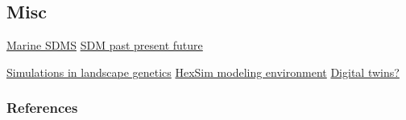\documentclass[
  12pt,
  a4paperpaper,
]{article}
\begin{document}
\subsection{Misc}\label{misc}

\href{https://doi.org/10.1016/j.ecolmodel.2019.108837}{Marine SDMS}
\href{https://doi.org/10.1111/jbi.14617}{SDM past present future}

\href{https://doi.org/10.1111/j.1365-294X.2010.04678.x}{Simulations in
landscape genetics}
\href{https://doi.org/10.1007/s10980-017-0605-9}{HexSim modeling
environment} \href{https://doi.org/10.1016/j.tree.2023.04.010}{Digital
twins?}

\newpage{}

\subsubsection{References}\label{references}
\end{document}
